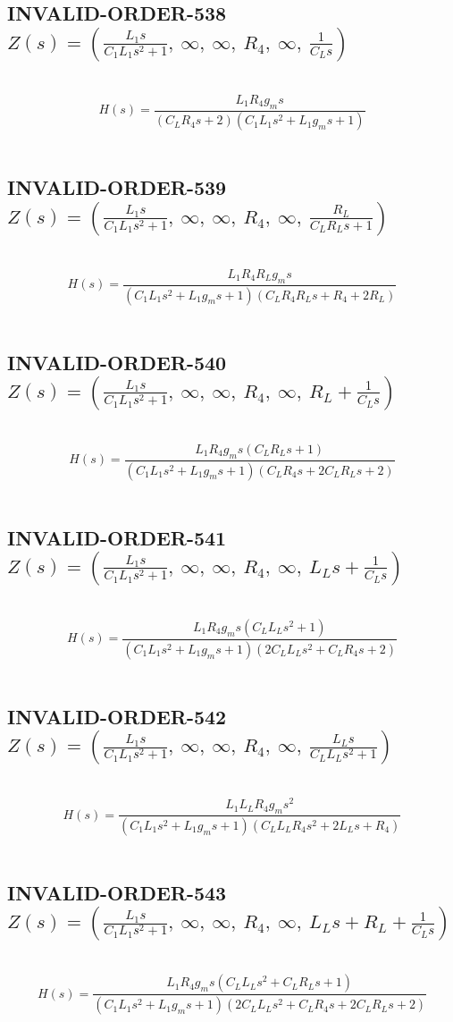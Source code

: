 \documentclass{article}
\begin{document}
\subsection{INVALID-ORDER-538 $Z(s) = \left( \frac{L_{1} s}{C_{1} L_{1} s^{2} + 1}, \  \infty, \  \infty, \  R_{4}, \  \infty, \  \frac{1}{C_{L} s}\right)$ } \ 
\textbf{\[H(s) = \frac{L_{1} R_{4} g_{m} s}{\left(C_{L} R_{4} s + 2\right) \left(C_{1} L_{1} s^{2} + L_{1} g_{m} s + 1\right)}\] } \ 
\subsection{INVALID-ORDER-539 $Z(s) = \left( \frac{L_{1} s}{C_{1} L_{1} s^{2} + 1}, \  \infty, \  \infty, \  R_{4}, \  \infty, \  \frac{R_{L}}{C_{L} R_{L} s + 1}\right)$ } \ 
\textbf{\[H(s) = \frac{L_{1} R_{4} R_{L} g_{m} s}{\left(C_{1} L_{1} s^{2} + L_{1} g_{m} s + 1\right) \left(C_{L} R_{4} R_{L} s + R_{4} + 2 R_{L}\right)}\] } \ 
\subsection{INVALID-ORDER-540 $Z(s) = \left( \frac{L_{1} s}{C_{1} L_{1} s^{2} + 1}, \  \infty, \  \infty, \  R_{4}, \  \infty, \  R_{L} + \frac{1}{C_{L} s}\right)$ } \ 
\textbf{\[H(s) = \frac{L_{1} R_{4} g_{m} s \left(C_{L} R_{L} s + 1\right)}{\left(C_{1} L_{1} s^{2} + L_{1} g_{m} s + 1\right) \left(C_{L} R_{4} s + 2 C_{L} R_{L} s + 2\right)}\] } \ 
\subsection{INVALID-ORDER-541 $Z(s) = \left( \frac{L_{1} s}{C_{1} L_{1} s^{2} + 1}, \  \infty, \  \infty, \  R_{4}, \  \infty, \  L_{L} s + \frac{1}{C_{L} s}\right)$ } \ 
\textbf{\[H(s) = \frac{L_{1} R_{4} g_{m} s \left(C_{L} L_{L} s^{2} + 1\right)}{\left(C_{1} L_{1} s^{2} + L_{1} g_{m} s + 1\right) \left(2 C_{L} L_{L} s^{2} + C_{L} R_{4} s + 2\right)}\] } \ 
\subsection{INVALID-ORDER-542 $Z(s) = \left( \frac{L_{1} s}{C_{1} L_{1} s^{2} + 1}, \  \infty, \  \infty, \  R_{4}, \  \infty, \  \frac{L_{L} s}{C_{L} L_{L} s^{2} + 1}\right)$ } \ 
\textbf{\[H(s) = \frac{L_{1} L_{L} R_{4} g_{m} s^{2}}{\left(C_{1} L_{1} s^{2} + L_{1} g_{m} s + 1\right) \left(C_{L} L_{L} R_{4} s^{2} + 2 L_{L} s + R_{4}\right)}\] } \ 
\subsection{INVALID-ORDER-543 $Z(s) = \left( \frac{L_{1} s}{C_{1} L_{1} s^{2} + 1}, \  \infty, \  \infty, \  R_{4}, \  \infty, \  L_{L} s + R_{L} + \frac{1}{C_{L} s}\right)$ } \ 
\textbf{\[H(s) = \frac{L_{1} R_{4} g_{m} s \left(C_{L} L_{L} s^{2} + C_{L} R_{L} s + 1\right)}{\left(C_{1} L_{1} s^{2} + L_{1} g_{m} s + 1\right) \left(2 C_{L} L_{L} s^{2} + C_{L} R_{4} s + 2 C_{L} R_{L} s + 2\right)}\] } \ 
\end{document}
